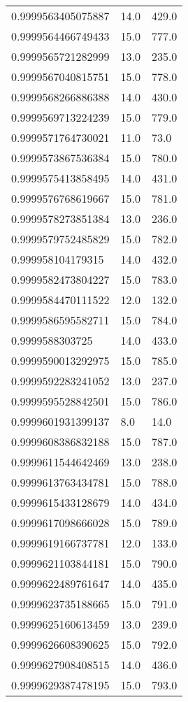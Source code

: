\begin{center}
\begin{supertabular}[H]{p{0.30\textwidth}p{0.05\textwidth}p{0.05\textwidth}}
0.9999563405075887 & 14.0 & 429.0 \\ 
0.9999564466749433 & 15.0 & 777.0 \\ 
0.9999565721282999 & 13.0 & 235.0 \\ 
0.9999567040815751 & 15.0 & 778.0 \\ 
0.9999568266886388 & 14.0 & 430.0 \\ 
0.9999569713224239 & 15.0 & 779.0 \\ 
0.9999571764730021 & 11.0 & 73.0 \\ 
0.9999573867536384 & 15.0 & 780.0 \\ 
0.9999575413858495 & 14.0 & 431.0 \\ 
0.9999576768619667 & 15.0 & 781.0 \\ 
0.9999578273851384 & 13.0 & 236.0 \\ 
0.9999579752485829 & 15.0 & 782.0 \\ 
0.999958104179315 & 14.0 & 432.0 \\ 
0.9999582473804227 & 15.0 & 783.0 \\ 
0.9999584470111522 & 12.0 & 132.0 \\ 
0.9999586595582711 & 15.0 & 784.0 \\ 
0.9999588303725 & 14.0 & 433.0 \\ 
0.9999590013292975 & 15.0 & 785.0 \\ 
0.9999592283241052 & 13.0 & 237.0 \\ 
0.9999595528842501 & 15.0 & 786.0 \\ 
0.9999601931399137 & 8.0 & 14.0 \\ 
0.9999608386832188 & 15.0 & 787.0 \\ 
0.9999611544642469 & 13.0 & 238.0 \\ 
0.9999613763434781 & 15.0 & 788.0 \\ 
0.9999615433128679 & 14.0 & 434.0 \\ 
0.9999617098666028 & 15.0 & 789.0 \\ 
0.9999619166737781 & 12.0 & 133.0 \\ 
0.9999621103844181 & 15.0 & 790.0 \\ 
0.9999622489761647 & 14.0 & 435.0 \\ 
0.9999623735188665 & 15.0 & 791.0 \\ 
0.9999625160613459 & 13.0 & 239.0 \\ 
0.9999626608390625 & 15.0 & 792.0 \\ 
0.9999627908408515 & 14.0 & 436.0 \\ 
0.9999629387478195 & 15.0 & 793.0 \\ 

\end{supertabular}
\end{center}
